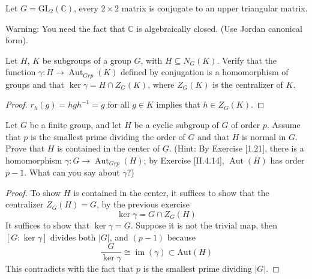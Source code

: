 \documentclass[openany]{book}
\newcommand{\C}{\mathbb{C}}
\DeclareMathOperator{\im}{im}
\begin{document}
\begin{prop}
    Let $G=\text{GL}_2(\C)$, every $2\times 2$ matrix is conjugate to an upper triangular matrix.

    Warning: You need the fact that $\C$ is algebraically closed. (Use Jordan canonical form).
\end{prop}




\begin{prob}[1.21]
Let $H$, $K$ be subgroups of a group $G$, with $H \subseteq N_G(K)$. Verify that the function $\gamma : H \to \operatorname{Aut}_{Grp}(K)$ defined by conjugation is a homomorphism of groups and that $\ker \gamma = H \cap Z_G(K)$, where $Z_G(K)$ is the centralizer of $K$.
\end{prob}
\begin{proof}
   $r_h(g)=hgh^{-1}=g$ for all $g\in K$ implies that $h\in Z_G(K)$.
\end{proof}

\begin{prob}[1.22]
Let $G$ be a finite group, and let $H$ be a cyclic subgroup of $G$ of order $p$. Assume that $p$ is the smallest prime dividing the order of $G$ and that $H$ is normal in $G$. Prove that $H$ is contained in the center of $G$. (Hint: By Exercise [1.21], there is a homomorphism $\gamma : G \to \operatorname{Aut}_{Grp}(H)$; by Exercise [II.4.14], $\operatorname{Aut}(H)$ has order $p - 1$. What can you say about $\gamma$?) 
\end{prob}
\begin{proof}
    To show $H$ is contained in the center, it suffices to show that the centralizer $Z_G(H)=G$, by the previous exercise 
    \begin{equation*}
        \ker\gamma=G\cap Z_G(H)
    \end{equation*}
    It suffices to show that $\ker\gamma=G$. Suppose it is not the trivial map, then $[G:\ker\gamma]$ divides both $|G|$, and $(p-1)$ because 
    \begin{equation*}
        \frac{G}{\ker\gamma}\cong\im(\gamma)\subset\text{Aut}(H)
    \end{equation*}
    This contradicts with the fact that $p$ is the smallest prime dividing $|G|$. 
\end{proof}
\end{document}
